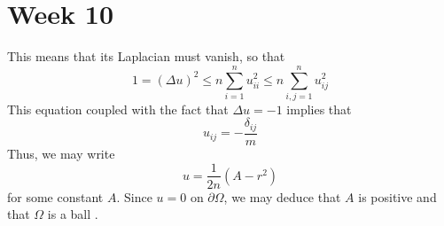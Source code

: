\documentclass[12pt]{article}
\begin{document}
 \section*{Week 10}
 This means that its Laplacian must vanish, so that
 \[
1 = (\Delta u)^2 \leq n \sum_{i=1}^n u_{ii}^2 \leq n \sum_{i,j = 1}^n u_{ij}^2
 \] This equation coupled with the fact that \(\Delta u = -1\) implies that
 \[
 u_{ij} = -\frac{\delta_{ij}}{m}
 \] Thus, we may write
 \[
 u = \frac{1}{2n}(A - r^2)
 \] for some constant $A$. Since $u = 0$ on $\partial{\Omega}$, we may deduce that $A$ is positive and that $\Omega$ is a ball \cite{weinberger71}.

 
\end{document}
